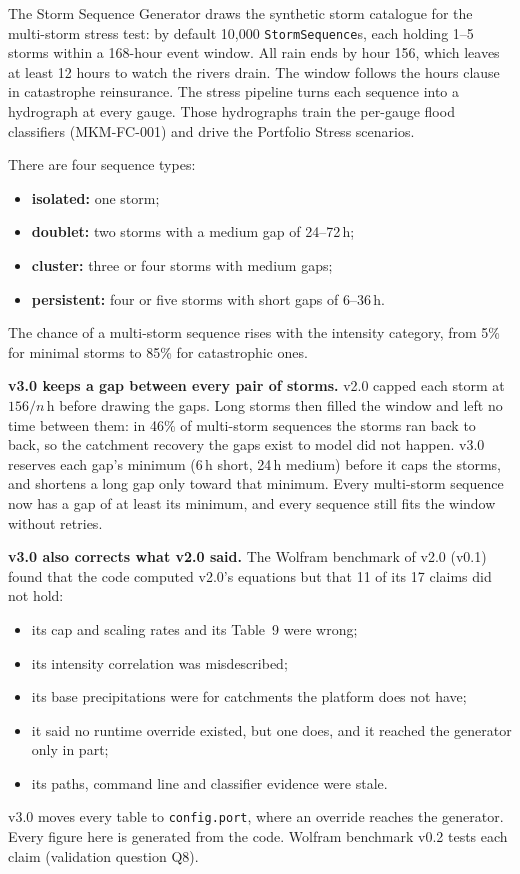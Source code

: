 \documentclass[11pt,a4paper]{article}
\begin{document}
\sloppy
\mkmtitlepage
\mkmlegalpage
\tableofcontents
\clearpage

\mkmexecsummary

The Storm Sequence Generator draws the synthetic storm catalogue for the multi-storm
stress test: by default 10{,}000 \texttt{StormSequence}s, each holding 1--5 storms within a
168-hour event window. All rain ends by hour 156, which leaves at least 12 hours to watch
the rivers drain. The window follows the hours clause in catastrophe reinsurance. The
stress pipeline turns each sequence into a hydrograph at every gauge. Those hydrographs
train the per-gauge flood classifiers (MKM-FC-001) and drive the Portfolio Stress scenarios.

There are four sequence types:
\begin{itemize}[nosep]
    \item \textbf{isolated:} one storm;
    \item \textbf{doublet:} two storms with a medium gap of 24--72\,h;
    \item \textbf{cluster:} three or four storms with medium gaps;
    \item \textbf{persistent:} four or five storms with short gaps of 6--36\,h.
\end{itemize}
The chance of a multi-storm sequence rises with the intensity category, from 5\% for
minimal storms to 85\% for catastrophic ones.

\textbf{v3.0 keeps a gap between every pair of storms.} v2.0 capped each storm at
$156/n$\,h before drawing the gaps. Long storms then filled the window and left no time
between them: in 46\% of multi-storm sequences the storms ran back to back, so the
catchment recovery the gaps exist to model did not happen. v3.0 reserves each gap's
minimum (6\,h short, 24\,h medium) before it caps the storms, and shortens a long gap
only toward that minimum. Every multi-storm sequence now has a gap of at least its
minimum, and every sequence still fits the window without retries.

\textbf{v3.0 also corrects what v2.0 said.} The Wolfram benchmark of v2.0 (v0.1) found
that the code computed v2.0's equations but that 11 of its 17 claims did not hold:
\begin{itemize}[nosep]
    \item its cap and scaling rates and its Table~9 were wrong;
    \item its intensity correlation was misdescribed;
    \item its base precipitations were for catchments the platform does not have;
    \item it said no runtime override existed, but one does, and it reached the generator
          only in part;
    \item its paths, command line and classifier evidence were stale.
\end{itemize}
v3.0 moves every table to \texttt{config.port}, where an override reaches the generator.
Every figure here is generated from the code. Wolfram benchmark v0.2 tests each claim
(validation question Q8).
\end{document}
